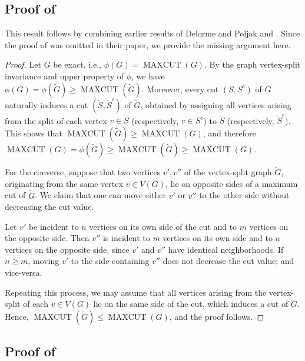 \documentclass[a4paper,fleqn]{cas-sc}
\newcommand{\1}{\mathbf{1}}
\DeclareMathOperator{\mc}{MAXCUT}
\begin{document}
\subsection{Proof of }

This result follows by combining earlier results of Delorme and Poljak
\cite[Lemma~2.1]{delorme1993performance} and \cite[Theorem~2.7]{delorme1993combinatorial}.
Since the proof of \cite[Lemma~2.1]{delorme1993performance} was omitted in their paper, we provide the missing argument here.


\begin{proof}
Let \( G \) be exact, i.e., \( \phi(G) = \mc(G) \). By the graph vertex-split invariance and upper property of \( \phi \), we have $\phi(G) =\phi(\widetilde{G}) \geq \mc(\widetilde{G}) $. Moreover, every cut \( (S, S^c) \) of \( G \) naturally induces a cut
\( (\widetilde{S}, \widetilde{S}^c) \) of \( \widetilde{G} \), obtained by assigning all
vertices arising from the split of each vertex \( v \in S \) (respectively,
\( v \in S^c \)) to \( \widetilde{S} \) (respectively, \( \widetilde{S}^c \)). This shows that $\mc(\widetilde{G}) \ge \mc(G)$, and therefore 
\( \mc(G) = \phi(\widetilde{G}) \geq \mc(\widetilde{G}) \geq \mc(G) \).

For the converse, suppose that two vertices \( v', v'' \) of the vertex-split graph
\( \widetilde{G} \), originating from the same vertex \( v \in V(G) \),
lie on opposite sides of a maximum cut of \( \widetilde{G} \).
We claim that one can move either \( v' \) or \( v'' \) to the other side
without decreasing the cut value.

Let \( v' \) be incident to \( n \) vertices on its own side of the cut
and to \( m \) vertices on the opposite side.
Then \( v'' \) is incident to \( m \) vertices on its own side and to
\( n \) vertices on the opposite side, since \( v' \) and \( v'' \) have
identical neighborhoods.
If \( n \ge m \), moving \( v' \) to the side containing \( v'' \) does not
decrease the cut value; and vice-versa.

Repeating this process, we may assume that all vertices arising from the
vertex-split of each \( v \in V(G) \) lie on the same side of the cut, which
induces a cut of \( G \).
Hence, $\mc(\widetilde{G}) \le \mc(G)$, and the proof follows.
\end{proof}



\subsection{Proof of }
\end{document}
